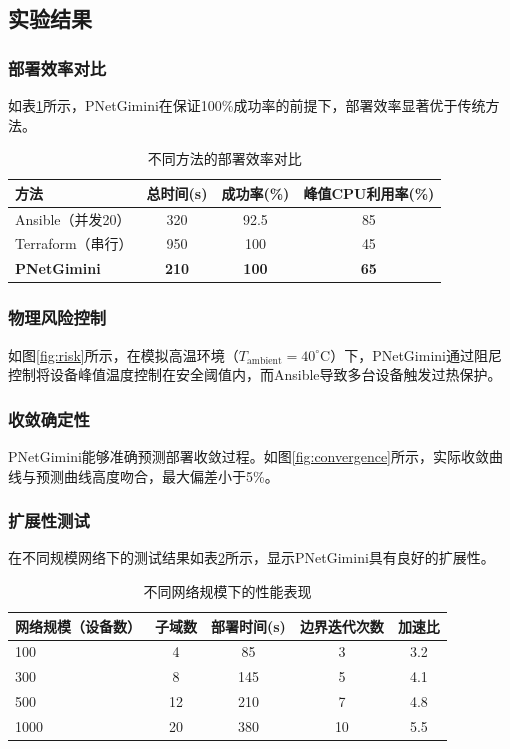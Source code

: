 \documentclass[12pt,a4paper]{article}
\begin{document}
\subsection{实验结果}
\subsubsection{部署效率对比}
如表\ref{tab:efficiency}所示，PNetGimini在保证100\%成功率的前提下，部署效率显著优于传统方法。

\begin{table}[htbp]
\centering
\caption{不同方法的部署效率对比}
\label{tab:efficiency}
\begin{tabular}{@{}lccc@{}}
\toprule
\textbf{方法} & \textbf{总时间(s)} & \textbf{成功率(\%)} & \textbf{峰值CPU利用率(\%)} \\
\midrule
Ansible（并发20） & 320 & 92.5 & 85 \\
Terraform（串行） & 950 & 100 & 45 \\
\textbf{PNetGimini} & \textbf{210} & \textbf{100} & \textbf{65} \\
\bottomrule
\end{tabular}
\end{table}

\subsubsection{物理风险控制}
如图\ref{fig:risk}所示，在模拟高温环境（$T_{\text{ambient}} = 40^\circ$C）下，PNetGimini通过阻尼控制将设备峰值温度控制在安全阈值内，而Ansible导致多台设备触发过热保护。

 

\subsubsection{收敛确定性}
PNetGimini能够准确预测部署收敛过程。如图\ref{fig:convergence}所示，实际收敛曲线与预测曲线高度吻合，最大偏差小于5\%。



\subsubsection{扩展性测试}
在不同规模网络下的测试结果如表\ref{tab:scalability}所示，显示PNetGimini具有良好的扩展性。

\begin{table}[htbp]
\centering
\caption{不同网络规模下的性能表现}
\label{tab:scalability}
\begin{tabular}{@{}lcccc@{}}
\toprule
\textbf{网络规模（设备数）} & \textbf{子域数} & \textbf{部署时间(s)} & \textbf{边界迭代次数} & \textbf{加速比} \\
\midrule
100 & 4 & 85 & 3 & 3.2 \\
300 & 8 & 145 & 5 & 4.1 \\
500 & 12 & 210 & 7 & 4.8 \\
1000 & 20 & 380 & 10 & 5.5 \\
\bottomrule
\end{tabular}
\end{table}
\end{document}

